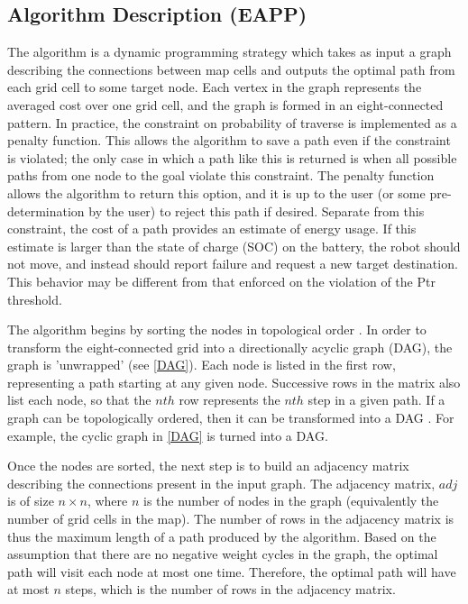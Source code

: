 \documentclass[journal]{IEEEtran}
\begin{document}
\subsection{Algorithm Description (EAPP)}
The algorithm is a dynamic programming strategy which takes as input a graph describing the connections between map cells and outputs the optimal path from each grid cell to some target node. 
Each vertex in the graph represents the averaged cost over one grid cell, and the graph is formed in an eight-connected pattern. 
In practice, the constraint on probability of traverse is implemented as a penalty function. 
This allows the algorithm to save a path even if the constraint is violated; the only case in which a path like this is returned is when all possible paths from one node to the goal violate this constraint. 
The penalty function allows the algorithm to return this option, and it is up to the user (or some pre-determination by the user) to reject this path if desired. 
Separate from this constraint, the cost of a path provides an estimate of energy usage. 
If this estimate is larger than the state of charge (SOC) on the battery, the robot should not move, and instead should report failure and request a new target destination. 
This behavior may be different from that enforced on the violation of the Ptr threshold.

The algorithm begins by sorting the nodes in topological order . 
In order to transform the eight-connected grid into a directionally acyclic graph (DAG), the graph is 'unwrapped' (see \ref{DAG}).
Each node is listed in the first row, representing a path starting at any given node. 
Successive rows in the matrix also list each node, so that the $nth$ row represents the $nth$ step in a given path. 
If a graph can be topologically ordered, then it can be transformed into a DAG \cite{vazirani algorithms ch. 6}. For example, the cyclic graph in \ref{DAG} is turned into a DAG.


Once the nodes are sorted, the next step is to build an adjacency matrix describing the connections present in the input graph.
The adjacency matrix, $adj$ is of size $n \times n$, where $n$ is the number of nodes in the graph (equivalently the number of grid cells in the map). 
The number of rows in the adjacency matrix is thus the maximum length of a path produced by the algorithm.
Based on the assumption that there are no negative weight cycles in the graph, the optimal path will visit each node at most one time.
Therefore, the optimal path will have at most $n$ steps, which is the number of rows in the adjacency matrix. 
\end{document}
